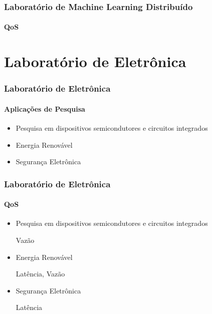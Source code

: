\documentclass{beamer}
\begin{document}
\begin{frame}
\frametitle{Laboratório de Machine Learning Distribuído}
\framesubtitle{QoS}
\begin{table}
  \centering
    \caption{Análise quantitativa de QoS para o Laboratório de Machine Learning Distribuído}
\end{table}
\end{frame}

\section[]{Laboratório de Eletrônica}
\begin{frame}
\frametitle{Laboratório de Eletrônica}
\framesubtitle{Aplicações de Pesquisa}
\begin{itemize}
\item{Pesquisa em dispositivos semicondutores e circuitos integrados}
\item{Energia Renovável}
\item{Segurança Eletrônica}
\end{itemize}
\end{frame}

\begin{frame}
\frametitle{Laboratório de Eletrônica}
\framesubtitle{QoS}
\begin{itemize}
\item{Pesquisa em dispositivos semicondutores e circuitos integrados}

    Vazão
\item{Energia Renovável}

    Latência, Vazão
\item{Segurança Eletrônica}

    Latência
\end{itemize}
\end{frame}
\end{document}
